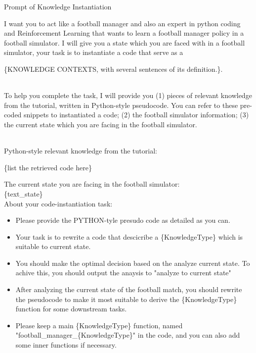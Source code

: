 \begin{gbox}{Prompt of Knowledge Instantiation}

I want you to act like a football manager and also an expert in python coding and Reinforcement Learning that wants to learn a football manager policy in a football simulator. 
I will give you a state which you are faced with in a football simulator, your task is to instantiate a code that serve as a 

\hspace{10mm} \{KNOWLEDGE CONTEXTS, with several sentences of its definition.\}.

~\\

To help you complete the task, I will provide you (1) pieces of relevant knowledge from the tutorial, written in Python-style pseudocode. You can refer to these pre-coded snippets to instantiated a code; (2) the football simulator information; (3) the current state which you are facing in the football simulator.

~\\


Python-style relevant knowledge from the tutorial:

\hspace{10mm} \{list the retrieved code here\}

The current state you are facing in the football simulator:
~\\

\hspace{10mm} \{text\_state\}
~\\

About your code-instantiation task:
\begin{itemize}
    \item Please provide the PYTHON-tyle presudo code as detailed as you can.
    \item Your task is to rewrite a code that descicribe a \{KnowledgeType\} which is suitable to current state.  
    \item You should make the optimal decision based on the analyze current state. To achive this, you should output the anaysis to "analyze to current state" 
    \item After analyzing the current state of the football match, you should rewrite the pseudocode to make it most suitable to derive the \{KnowledgeType\} function for some downstream tasks.
    \item Please keep a main \{KnowledgeType\} function, named "football\_manager\_\{KnowledgeType\}" in the code, and you can also add some inner functions if necessary. 
\end{itemize}


\end{gbox}
